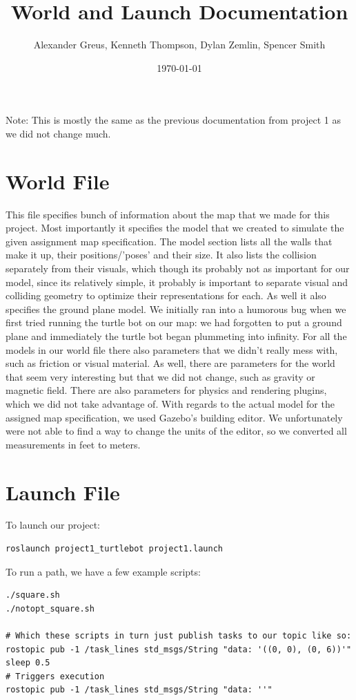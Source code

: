 \documentclass[12pt]{article}
\title{World and Launch Documentation}
\author{Alexander Greus, Kenneth Thompson, Dylan Zemlin, Spencer Smith}
\date{\today}
\begin{document}
\maketitle

Note: This is mostly the same as the previous documentation from project 1 as we did not change much.

\part*{World File}
This file specifies bunch of information about the map that we made for this project. Most importantly it specifies the model that we created to simulate the given assignment map specification. The model section lists all the walls that make it up, their positions/'poses' and their size. It also lists the collision separately from their visuals, which though its probably not as important for our model, since its relatively simple, it probably is important to separate visual and colliding geometry to optimize their representations for each. As well it also specifies the ground plane model. We initially ran into a humorous bug when we first tried running the turtle bot on our map: we had forgotten to put a ground plane and immediately the turtle bot began plummeting into infinity. For all the models in our world file there also parameters that we didn't really mess with, such as friction or visual material. As well, there are parameters for the world that seem very interesting but that we did not change, such as gravity or magnetic field. There are also parameters for physics and rendering plugins, which we did not take advantage of. With regards to the actual model for the assigned map specification, we used Gazebo's building editor. We unfortunately were not able to find a way to change the units of the editor, so we converted all measurements in feet to meters.

\part*{Launch File}
To launch our project:
\begin{lstlisting}
roslaunch project1_turtlebot project1.launch
\end{lstlisting}
To run a path, we have a few example scripts:
\begin{lstlisting}
./square.sh
./notopt_square.sh

# Which these scripts in turn just publish tasks to our topic like so:
rostopic pub -1 /task_lines std_msgs/String "data: '((0, 0), (0, 6))'"
sleep 0.5
# Triggers execution
rostopic pub -1 /task_lines std_msgs/String "data: ''"
\end{lstlisting}
\end{document}
